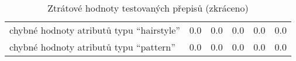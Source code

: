 \begin{table}[ht!]
\begin{tabular}{|l|c|c|c|c|c|}
		chybné hodnoty atributů typu \enquote{hairstyle}    & 0.0                                         & 0.0        & 0.0        & 0.0        & 0.0        \\
		chybné hodnoty atributů typu \enquote{pattern}      & 0.0                                         & 0.0        & 0.0        & 0.0        & 0.0        \\
		\hline
	\end{tabular}
	\caption{Ztrátové hodnoty testovaných přepisů (zkráceno)}\label{tab:out_values}
\end{table}

